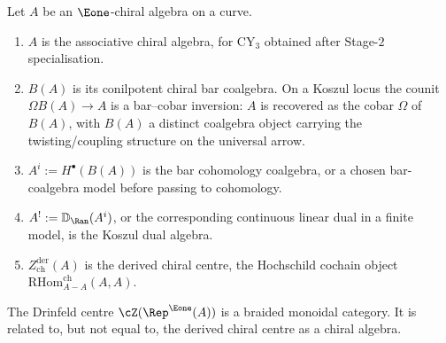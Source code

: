 \begin{definition}
\label{def:qca-five-objects}
Let \(A\) be an \(\Eone\)-chiral algebra on a curve.
\begin{enumerate}[label=\textup{(\roman*)}]
\item \(A\) is the associative chiral algebra, for CY$_3$ obtained after
Stage-$2$ specialisation.
\item \(B(A)\) is its conilpotent chiral bar coalgebra.  On a Koszul
locus the counit \(\Omega B(A)\to A\) is a bar--cobar inversion: $A$
is recovered as the cobar $\Omega$ of $B(A)$, with $B(A)$ a distinct
coalgebra object carrying the twisting/coupling structure on the
universal arrow.
\item \(A^i:=H^\bullet(B(A))\) is the bar cohomology coalgebra, or a
chosen bar-coalgebra model before passing to cohomology.
\item \(A^!:=\mathbb D_{\Ran}(A^i)\), or the corresponding continuous
linear dual in a finite model, is the Koszul dual algebra.
\item \(Z^{\mathrm{der}}_{\mathrm{ch}}(A)\) is the derived chiral centre,
the Hochschild cochain object \(\mathrm{RHom}^{\mathrm{ch}}_{A-A}(A,A)\).
\end{enumerate}
The Drinfeld centre \(\cZ(\Rep^{\Eone}(A))\) is a braided monoidal
category.  It is related to, but not equal to, the derived chiral centre
as a chiral algebra.
\end{definition}

